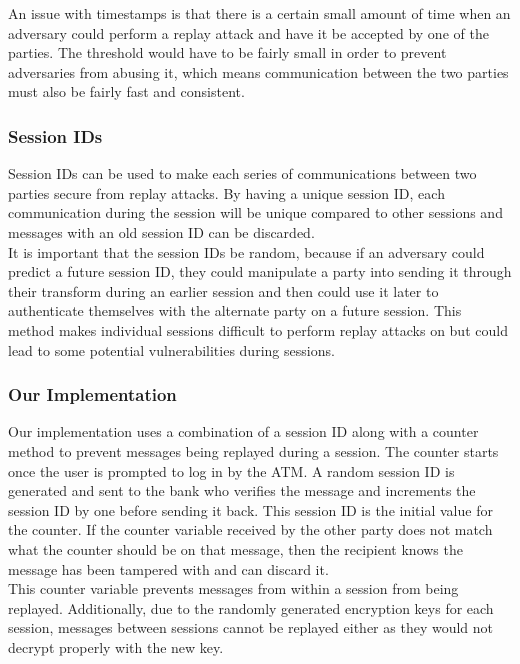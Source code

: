 			An issue with timestamps is that there is a certain small amount of time when an adversary could perform a replay attack and have it be accepted by one of the parties. The threshold would have to be fairly small in order to prevent adversaries from abusing it, which means communication between the two parties must also be fairly fast and consistent.

		\subsubsection{Session IDs}\label{sec:replaysessions}
			Session IDs can be used to make each series of communications between two parties secure from replay attacks. By having a unique session ID, each communication during the session will be unique compared to other sessions and messages with an old session ID can be discarded. \\

			It is important that the session IDs be random, because if an adversary could predict a future session ID, they could manipulate a party into sending it through their transform during an earlier session and then could use it later to authenticate themselves with the alternate party on a future session. This method makes individual sessions difficult to perform replay attacks on but could lead to some potential vulnerabilities during sessions.

		\subsubsection{Our Implementation}\label{sec:replayimplementation}
			Our implementation uses a combination of a session ID along with a counter method to prevent messages being replayed during a session. The counter starts once the user is prompted to log in by the ATM. A random session ID is generated and sent to the bank who verifies the message and increments the session ID by one before sending it back. This session ID is the initial value for the counter. If the counter variable received by the other party does not match what the counter should be on that message, then the recipient knows the message has been tampered with and can discard it.\\

			This counter variable prevents messages from within a session from being replayed. Additionally, due to the randomly generated encryption keys for each session, messages between sessions cannot be replayed either as they would not decrypt properly with the new key. 


